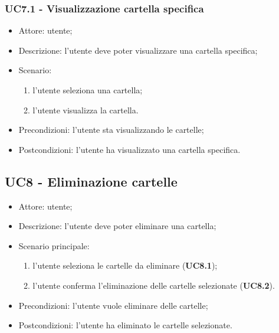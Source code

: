     \subsubsection{UC7.1 - Visualizzazione cartella specifica}
    \begin{itemize}
        \item Attore: utente;
        \item Descrizione: l'utente deve poter visualizzare una cartella specifica;
        \item Scenario:
        \begin{enumerate}
        \item l'utente seleziona una cartella;
        \item l'utente visualizza la cartella.
        \end{enumerate}
        \item Precondizioni: l'utente sta visualizzando le cartelle;
        \item Postcondizioni: l'utente ha visualizzato una cartella specifica.
    \end{itemize}

    \subsection{UC8 - Eliminazione cartelle}
    \begin{itemize}
        \item Attore: utente;
        \item Descrizione: l'utente deve poter eliminare una cartella;
        \item Scenario principale:
            \begin{enumerate}
            \item l'utente seleziona le cartelle da eliminare (\textbf{UC8.1});
            \item l'utente conferma l'eliminazione delle cartelle selezionate (\textbf{UC8.2}).
            \end{enumerate}
        \item Precondizioni: l'utente vuole eliminare delle cartelle;
        \item Postcondizioni: l'utente ha eliminato le cartelle selezionate.
    \end{itemize}
